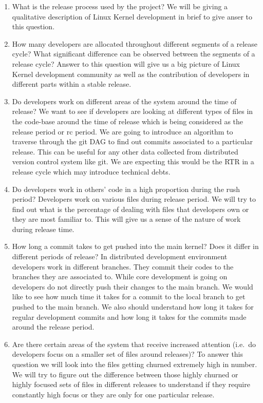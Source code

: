 \documentclass{acm_proc_article-sp}
\begin{document}
\renewcommand{\labelenumi}{RQ\theenumi:}
\begin{enumerate}
\item What is the release process used by the project? \newline
We will be giving a qualitative description of Linux Kernel development in brief to give anser to this question.
\item How many developers are allocated throughout different segments of a release cycle? What significant difference can be observed between the segments of a release cycle? \newline
Answer to this question will give us a big picture of Linux Kernel development community as well as the contribution of developers in different parts within a stable release.
\item Do developers work on different areas of the system around the time of release? \newline
We want to see if developers are looking at different types of files in the code-base around the time of release which is being considered as the release period or rc period. We are going to introduce an algorithm to traverse through the git DAG to find out commits associated to a particular release. This can be useful for any other data collected from distributed version control system like git. We are expecting this would be the RTR in a release cycle which may introduce technical debts.
\item Do developers work in others' code in a high proportion during the rush period?\newline
Developers work on various files during release period. We will try to find out what is the percentage of dealing with files that developers own or they are most familiar to. This will give us a sense of the nature of work during release time.
\item How long a commit takes to get pushed into the main kernel? Does it differ in different periods of release?\newline
In distributed development environment developers work in different branches. They commit their codes to the branches they are associated to. While core development is going on developers do not directly push their changes to the main branch. We would like to see how much time it takes for a commit to the local branch to get pushed to the main branch. We also should understand how long it takes for regular development commits and how long it takes for the commits made around the release period.
\item Are there certain areas of the system that receive increased attention (i.e.\ do developers focus on a smaller set of files around releases)? \newline
To answer this question we will look into the files getting churned extremely high in number. We will try to figure out the difference between those highly churned or highly focused sets of files in different releases to understand if they require constantly high focus or they are only for one particular release.
\end{enumerate}
\end{document}
